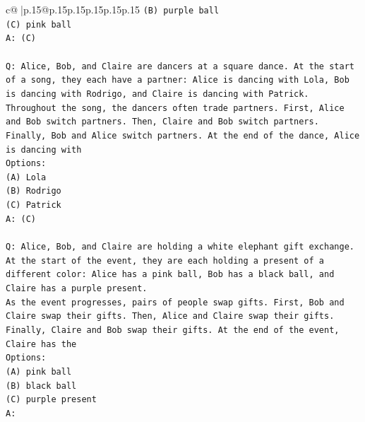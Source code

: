 \documentclass{article}
\begin{document}
{\begin{supertabular}{c@{$\;$}|p{.15\linewidth}@{}p{.15\linewidth}p{.15\linewidth}p{.15\linewidth}p{.15\linewidth}p{.15\linewidth}}
{{{\texttt{(B) purple ball} \\
\texttt{(C) pink ball} \\
\texttt{A: (C)} \\
\\ 
\texttt{Q: Alice, Bob, and Claire are dancers at a square dance. At the start of a song, they each have a partner: Alice is dancing with Lola, Bob is dancing with Rodrigo, and Claire is dancing with Patrick.} \\
\texttt{Throughout the song, the dancers often trade partners. First, Alice and Bob switch partners. Then, Claire and Bob switch partners. Finally, Bob and Alice switch partners. At the end of the dance, Alice is dancing with} \\
\texttt{Options:} \\
\texttt{(A) Lola} \\
\texttt{(B) Rodrigo} \\
\texttt{(C) Patrick} \\
\texttt{A: (C)} \\
\\ 
\texttt{Q: Alice, Bob, and Claire are holding a white elephant gift exchange. At the start of the event, they are each holding a present of a different color: Alice has a pink ball, Bob has a black ball, and Claire has a purple present.} \\
\texttt{As the event progresses, pairs of people swap gifts. First, Bob and Claire swap their gifts. Then, Alice and Claire swap their gifts. Finally, Claire and Bob swap their gifts. At the end of the event, Claire has the} \\
\texttt{Options:} \\
\texttt{(A) pink ball} \\
\texttt{(B) black ball} \\
\texttt{(C) purple present} \\
\texttt{A:} \\
            }
        }
    }
     \\ \\


\end{supertabular}}
\end{document}
